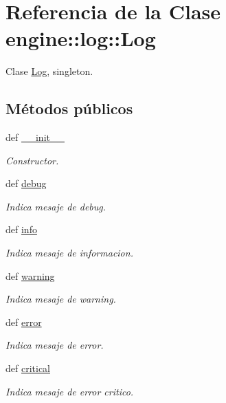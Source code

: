 \hypertarget{classengine_1_1log_1_1Log}{
\section{\-Referencia de la \-Clase engine\-:\-:log\-:\-:\-Log}
\label{classengine_1_1log_1_1Log}
}


\-Clase \hyperlink{classengine_1_1log_1_1Log}{\-Log}, singleton.  


\subsection*{\-Métodos públicos}
\begin{DoxyCompactItemize}
\item 
\hypertarget{classengine_1_1log_1_1Log_ab87d56d6bc90f85824c1c5d9ab8339bc}{
def \hyperlink{classengine_1_1log_1_1Log_ab87d56d6bc90f85824c1c5d9ab8339bc}{\-\_\-\-\_\-init\-\_\-\-\_\-}}
\label{classengine_1_1log_1_1Log_ab87d56d6bc90f85824c1c5d9ab8339bc}

\begin{DoxyCompactList}\small\item\em \-Constructor. \end{DoxyCompactList}\item 
def \hyperlink{classengine_1_1log_1_1Log_a27e932502f8ffdae38489654a761a119}{debug}
\begin{DoxyCompactList}\small\item\em \-Indica mesaje de debug. \end{DoxyCompactList}\item 
def \hyperlink{classengine_1_1log_1_1Log_a1aad83b2a5fbcaa996bf1241e3e85dab}{info}
\begin{DoxyCompactList}\small\item\em \-Indica mesaje de informacion. \end{DoxyCompactList}\item 
def \hyperlink{classengine_1_1log_1_1Log_ababfde831153a2b516d79ab01c9a2e69}{warning}
\begin{DoxyCompactList}\small\item\em \-Indica mesaje de warning. \end{DoxyCompactList}\item 
def \hyperlink{classengine_1_1log_1_1Log_acf7ea4a16ad7041558dd821a561223e7}{error}
\begin{DoxyCompactList}\small\item\em \-Indica mesaje de error. \end{DoxyCompactList}\item 
def \hyperlink{classengine_1_1log_1_1Log_aa0cbf73888c307cf5db942ad83421fdc}{critical}
\begin{DoxyCompactList}\small\item\em \-Indica mesaje de error critico. \end{DoxyCompactList}\end{DoxyCompactItemize}
